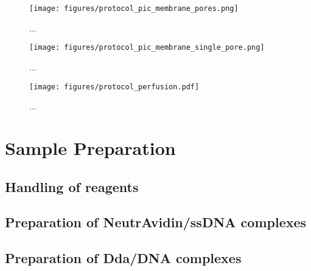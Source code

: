 \begin{figure}[h]
\begin{centering}
\texttt{[image: figures/protocol\_pic\_membrane\_pores.png]}
\caption[Diagram of nanopore introduction]{...}
\label{fig:protocol_pores}
\end{centering}
\end{figure}

\begin{figure}[h]
\begin{centering}
\texttt{[image: figures/protocol\_pic\_membrane\_single\_pore.png]}
\caption[Diagram of single nanopore capture]{...}
\label{fig:protocol_single_pore}
\end{centering}
\end{figure}

\begin{figure}[h]
\begin{centering}
\texttt{[image: figures/protocol\_perfusion.pdf]}
\caption[Setup for removing nanopores by buffer perfusion]{...}
\label{fig:protocol_perfusion}
\end{centering}
\end{figure}

\section{Sample Preparation}
\label{sample_prep}

\subsection{Handling of reagents}



\subsection{Preparation of NeutrAvidin/ssDNA complexes}



\subsection{Preparation of Dda/DNA complexes}

